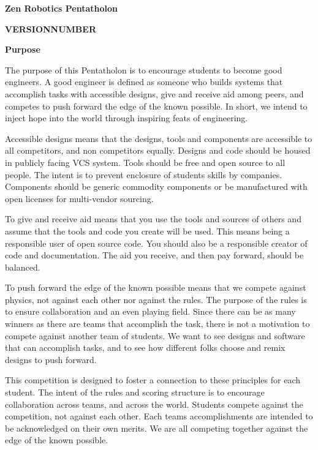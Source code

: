 \documentclass{article}
\begin{document}
	
{\huge \textbf{Zen Robotics Pentatholon}}

\vspace{1cm}

{\huge \textbf{VERSIONNUMBER}}

\vspace{1cm}

{\huge \textbf{Purpose}}
\vspace{1cm}

The purpose of this Pentatholon is to encourage students to become good engineers. A good engineer is defined as someone who builds systems that accomplish tasks with accessible designs, give and receive aid among peers, and competes to push forward the edge of the known possible. In short, we intend to inject hope into the world through inspiring feats of engineering.

Accessible designs means that the designs, tools and components are accessible to all competitors, and non competitors equally. Designs and code should be housed in publicly facing VCS system. Tools should be free and open source to all people. The intent is to prevent enclosure of students skills by companies.  Components should be generic commodity components or be manufactured with open licenses for multi-vendor sourcing.  

To give and receive aid means that you use the tools and sources of others and assume that the tools and code you create will be used. This means being a responsible user of open source code. You should also be a responsible creator of code and documentation. The aid you receive, and then pay forward, should be  balanced. 

To push forward the edge of the known possible means that we compete against physics, not against each other nor against the rules. The purpose of the rules is to ensure collaboration and an even playing field. Since there can be as many winners as there are teams that accomplish the task, there is not a motivation to compete against another team of students. We want to see designs and software that can accomplish tasks, and to see how different folks choose and remix designs to push forward. 

  
This competition is designed to foster a connection to these principles for each student. The intent of the rules and scoring structure is to encourage collaboration across teams, and across the world. Students compete against the competition, not against each other. Each teams accomplishments are intended to be acknowledged on their own merits. We are all competing together against the edge of the known possible.
\pagebreak
\end{document}
